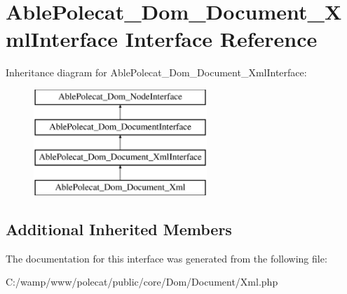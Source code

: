 \hypertarget{interface_able_polecat___dom___document___xml_interface}{}\section{Able\+Polecat\+\_\+\+Dom\+\_\+\+Document\+\_\+\+Xml\+Interface Interface Reference}
\label{interface_able_polecat___dom___document___xml_interface}
Inheritance diagram for Able\+Polecat\+\_\+\+Dom\+\_\+\+Document\+\_\+\+Xml\+Interface\+:\begin{figure}[H]
\begin{center}
\leavevmode
\includegraphics[height=4.000000cm]{interface_able_polecat___dom___document___xml_interface}
\end{center}
\end{figure}
\subsection*{Additional Inherited Members}


The documentation for this interface was generated from the following file\+:\begin{DoxyCompactItemize}
\item 
C\+:/wamp/www/polecat/public/core/\+Dom/\+Document/Xml.\+php\end{DoxyCompactItemize}
